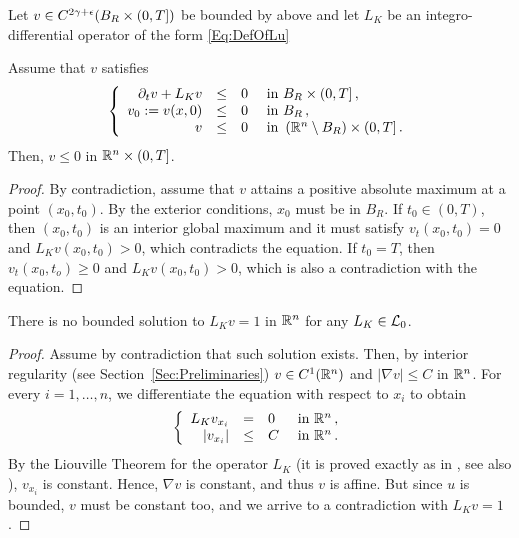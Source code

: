 \begin{theorem}
\label{Th:ParabolicmaxPrpBdd}
Let  $v \in C^{2\gamma+\epsilon}(B_R\times(0,T])$ be bounded by above and let $L_K$ be an integro-differential operator of the form \eqref{Eq:DefOfLu}

Assume that $v$ satisfies
\begin{equation*}
\left\{\begin{array}{rcll}
\partial_t v + L_K v &\leq& 0 & \textrm{ in }B_R\times(0,T]\,,\\
v_0:=v(x,0) &\leq& 0 & \textrm{ in } B_R\,,\\
v &\leq& 0 & \textrm{ in } \left( \mathbb{R}^n\setminus B_R\right) \times (0,T] \,.
\end{array} \right.
\end{equation*}
Then, $v\leq 0$ in $\mathbb{R}^n\times (0,T]$.
\end{theorem}

\begin{proof}
By contradiction, assume that $v$ attains a positive absolute maximum at a point $(x_0,t_0)$. By the exterior conditions, $x_0$ must be in $B_R$. If $t_0\in(0,T)$, then $(x_0,t_0)$ is an interior global maximum and it must satisfy $v_t(x_0,t_0)=0$ and $L_K v(x_0,t_0)>0$, which contradicts the equation. If $t_0 = T$, then $v_t(x_0,t_o)\geq 0$ and $L_K v(x_0,t_0)>0$, which is also a contradiction with the equation.
\end{proof}

\begin{lemma}
\label{Lemma:NoBddSolL=1}
There is no bounded solution to $L_K v=1$ in $\mathbb{R}^n$ for any $L_K \in \mathcal{L}_0$.
\end{lemma}

\begin{proof}
Assume by contradiction that such solution exists. Then, by interior regularity (see Section~\ref{Sec:Preliminaries}) $v\in C^1(\mathbb{R}^n)$ and $|\nabla v|\leq C$ in $\mathbb{R}^n$. For every $i = 1,\ldots, n$, we differentiate the equation with respect to $x_i$ to obtain
\begin{equation*}
\left\{\begin{array}{rcll}
L_K  v_{x_i} &=& 0 & \textrm{ in } \mathbb{R}^n\,,\\
|v_{x_i}| &\leq& C & \textrm{ in } \mathbb{R}^n\,.
\end{array} \right.
\end{equation*}
By the Liouville Theorem for the operator $L_K $ (it is proved exactly as in \cite{RosOtonSerra-Stable}, see also \cite{SerraC2s+alphaRegularity}), $v_{x_i}$ is constant. Hence, $\nabla v$ is constant, and thus $v$ is affine. But since $u$ is bounded, $v$ must be constant too, and we arrive to a contradiction with $L_K v=1$.
\end{proof}

